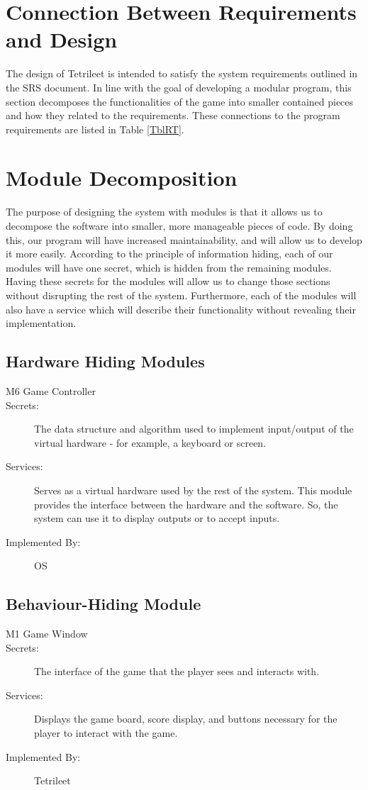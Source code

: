 \documentclass[12pt, titlepage]{article}
\begin{document}
\section{Connection Between Requirements and Design} \label{SecConnection}

The design of Tetrileet is intended to satisfy the system requirements outlined in the SRS document. In line with the goal of developing a modular program, this section decomposes the functionalities of the game into smaller contained pieces and how they related to the requirements. These connections to the program requirements are listed in Table \ref{TblRT}.

\section{Module Decomposition} \label{SecMD}

The purpose of designing the system with modules is that it allows us to decompose the software into smaller, more manageable pieces of code. By doing this, our program will have increased maintainability, and will allow us to develop it more easily. According to the principle of information hiding, each of our modules will have one secret, which is hidden from the remaining modules. Having these secrets for the modules will allow us to change those sections without disrupting the rest of the system. Furthermore, each of the modules will also have a service which will describe their functionality without revealing their implementation.    

\subsection{Hardware Hiding Modules}

\begin{description}
\item[M6 Game Controller]
\item[Secrets:]The data structure and algorithm used to implement input/output of the virtual hardware - for example, a keyboard or screen.
\item[Services:]Serves as a virtual hardware used by the rest of the
  system. This module provides the interface between the hardware and the
  software. So, the system can use it to display outputs or to accept inputs.
\item[Implemented By:] OS
\end{description}

\subsection{Behaviour-Hiding Module}
\begin{description}
\item[M1 Game Window]
\item[Secrets:]The interface of the game that the player sees and interacts with.
\item[Services:]Displays the game board, score display, and buttons necessary for the player to interact with the game.
\item[Implemented By:] Tetrileet
\end{description}
\end{document}
